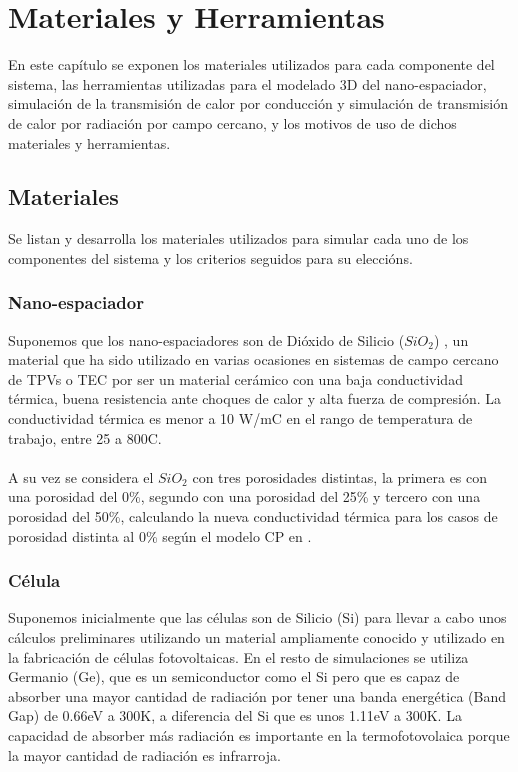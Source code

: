 \chapter{Materiales y Herramientas}
En este capítulo se exponen los materiales utilizados para cada componente del sistema, las herramientas utilizadas para el modelado 3D del nano-espaciador, simulación de la transmisión de calor por conducción y simulación de transmisión de calor por radiación por campo cercano, y los motivos de uso de dichos materiales y herramientas.
\section{Materiales}
Se listan y desarrolla los materiales utilizados para simular cada uno de los componentes del sistema y los criterios seguidos para su eleccións.
\subsection{Nano-espaciador}
Suponemos que los nano-espaciadores son de Dióxido de Silicio ($SiO_2$) \cite{doi:10.1063/1.1141498}, un material que ha sido utilizado en varias ocasiones en sistemas de campo cercano de TPVs o TEC por ser un material cerámico con una baja conductividad térmica, buena resistencia ante choques de calor y alta fuerza de compresión. La conductividad térmica es menor a 10 W/m\textdegree C en el rango de temperatura de trabajo, entre 25 a 800\textdegree C.\\\\
A su vez se considera el $SiO_2$ con tres porosidades distintas, la primera es con una porosidad del 0\%, segundo con una porosidad del 25\% y tercero con una porosidad del 50\%, calculando la nueva conductividad térmica para los casos de porosidad distinta al 0\% según el modelo CP en \cite{ThermalConductivity_SiO2_2018}.

\subsection{Célula}
Suponemos inicialmente que las células son de Silicio (Si) para llevar a cabo unos cálculos preliminares utilizando un material ampliamente conocido y utilizado en la fabricación de células fotovoltaicas. En el resto de simulaciones se utiliza Germanio (Ge), que es un semiconductor como el Si pero que es capaz de absorber una mayor cantidad de radiación por tener una banda energética (Band Gap) de 0.66eV a 300K, a diferencia del Si que es unos 1.11eV a 300K. La capacidad de absorber más radiación es importante en la termofotovolaica porque la mayor cantidad de radiación es infrarroja.\\

